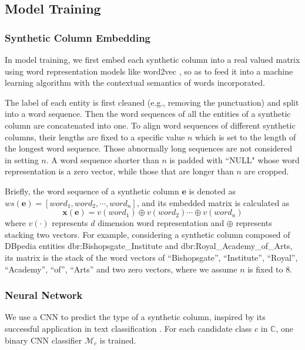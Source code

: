 \documentclass[letterpaper]{article}
\newcommand{\rv}[1]{{\color{black}#1}}
\newcommand{\camera}[1]{{\color{black}#1}}
\begin{document}
\subsection{Model Training}

\subsubsection{Synthetic Column Embedding}\label{sec:se}

In model training,
we first embed each synthetic column into a real valued matrix using word representation models \rv{like word2vec \cite{mikolov2013distributed},}
so as to feed it into a machine learning algorithm with the contextual \rv{semantics} of words incorporated.


The label of each entity is first cleaned (e.g., removing the punctuation) and split into a word sequence.
\rv{Then the word sequences of all the entities of a synthetic column are concatenated into one.}
To align word sequences of different synthetic columns, 
their lengths are fixed to a specific value $n$ which is set to the length of the longest word sequence.
\camera{Those abnormally long sequences are not considered in setting $n$.}
\camera{A} word sequence shorter than $n$ is padded with ``NULL" whose word representation is a zero vector,
while those that are longer than $n$ are cropped.




Briefly, the word sequence of a synthetic column $\bm{e}$ is denoted as $ws(\bm{e}) = \left[ word_1, word_2, \cdots, word_n \right]$,
and its embedded matrix 
is calculated as 
\begin{equation}
\bm{x}(\bm{e}) = v(word_1) \oplus v(word_2) \cdots \oplus v(word_n) 
\end{equation}
where $v(\cdot)$ represents $d$ dimension word representation 
and $\oplus$ represents stacking two vectors.
For example, considering a synthetic column composed of DBpedia entities dbr:Bishopsgate\_Institute and dbr:Royal\_Academy\_of\_Arts,
its matrix is the stack of the word vectors of ``Bishopsgate'', ``Institute'', ``Royal'', ``Academy'', ``of'', ``Arts'' and two zero vectors, where we assume $n$ is fixed to $8$. 

\subsubsection{Neural Network}
We use a CNN to predict the type of a synthetic column,
inspired by its successful application in text classification \cite{kim2014convolutional}.
For each candidate class $c$ in $\mathbb{C}$, 
one binary CNN classifier $\mathcal{M}_c$ is trained.
\end{document}
